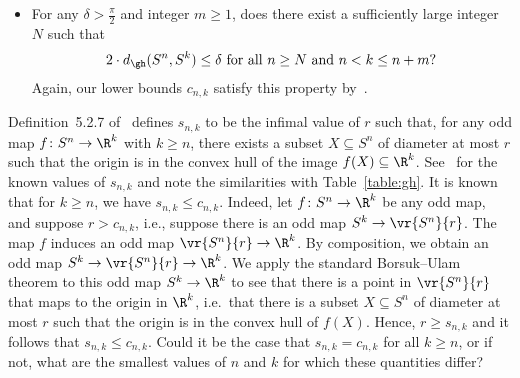 \documentclass[11pt, reqno, english]{amsart}
\begin{document}
\begin{question}
\begin{itemize}
    \item For any $\delta>\frac{\pi}{2}$ and integer $m\ge 1$, does there exist a sufficiently large integer $N$ such that
    \[ 2\cdot d_\gh(S^n,S^k)\le \delta \text{ for all } n\ge N \text{ and } n<k\le n+m?\]
    Again, our lower bounds $c_{n,k}$ satisfy this property by~\cite[Corollary 3.2]{ABF2}.
\end{itemize}
\end{question}

\begin{question}
Definition~5.2.7 of~\cite{BushThesis} defines $s_{n,k}$ to be the infimal value of $r$ such that, for any odd map $f\colon S^n \to \R^k$ with $k\ge n$, there exists a subset $X\subseteq S^n$ of diameter at most $r$ such that the origin is in the convex hull of the image $f(X)\subseteq \R^k$.
See~\cite[Table on Page~80]{BushThesis} for the known values of $s_{n,k}$ and note the similarities with Table~\ref{table:gh}.
It is known that for $k\ge n$, we have $s_{n,k}\le c_{n,k}$.
Indeed, let $f\colon S^n \to \R^k$ be any odd map, and suppose $r > c_{n,k}$, i.e., suppose there is an odd map $S^k \to \vr{S^n}{r}$.
The map $f$ induces an odd map $\vr{S^n}{r}\to \R^k$.
By composition, we obtain an odd map $S^k \to \vr{S^n}{r}\to \R^k$.
We apply the standard Borsuk--Ulam theorem to this odd map $S^k\to\R^k$ to see that there is a point in $\vr{S^n}{r}$ that maps to the origin in $\R^k$, i.e.\ that there is a subset $X\subseteq S^n$ of diameter at most $r$ such that the origin is in the convex hull of $f(X)$.
Hence, $r \ge s_{n,k}$ and it follows that $s_{n,k}\le c_{n,k}$.
Could it be the case that $s_{n,k}=c_{n,k}$ for all $k\ge n$, or if not, what are the smallest values of $n$ and $k$ for which these quantities differ?
\end{question}





\end{document}
